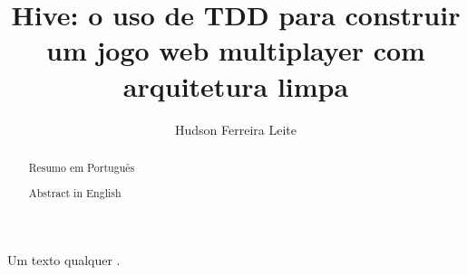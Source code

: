 \documentclass[a4paper,12pt]{article}
\title{Hive: o uso de TDD para construir um jogo web multiplayer com arquitetura limpa}
\author{Hudson Ferreira Leite}
\begin{document}
\maketitle

\begin{abstract}
  Resumo em Português
\end{abstract}

\begin{abstract}
  Abstract in English
\end{abstract}

Um texto qualquer \cite{freeman2009}.



\end{document}

